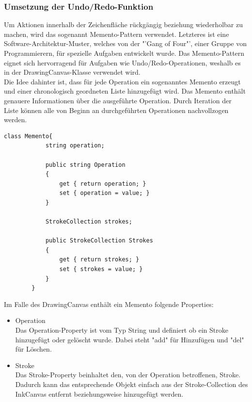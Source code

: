 \subsubsection{Umsetzung der Undo/Redo-Funktion}
Um Aktionen innerhalb der Zeichenfläche rückgängig beziehung wiederholbar zu machen, wird das sogenannt Memento-Pattern verwendet. Letzteres ist eine Software-Architektur-Muster, welches von der "'Gang of Four"', einer Gruppe von Programmierern, für spezielle Aufgaben entwickelt wurde. Das Memento-Pattern eignet sich hervorragend für Aufgaben wie Undo/Redo-Operationen, weshalb es in der DrawingCanvas-Klasse verwendet wird.\\
Die Idee dahinter ist, dass für jede Operation ein sogenanntes Memento erzeugt und einer chronologisch geordneten Liste hinzugefügt wird. Das Memento enthält genauere Informationen über die ausgeführte Operation. Durch Iteration der Liste können alle von Beginn an durchgeführten Operationen nachvollzogen werden.\\
\begin{lstlisting}[language = CSharp, captionpos=b, caption={Die Memento-Klasse}]
class Memento{
            string operation;

            public string Operation
            {
                get { return operation; }
                set { operation = value; }
            }

            StrokeCollection strokes;

            public StrokeCollection Strokes
            {
                get { return strokes; }
                set { strokes = value; }
            }
        }
\end{lstlisting}
Im Falle des DrawingCanvas enthält ein Memento folgende Properties:
\begin{itemize}
\item Operation\\
Das Operation-Property ist vom Typ String und definiert ob ein Stroke hinzugefügt oder gelöscht wurde. Dabei steht "add" für Hinzufügen und "del" für Löschen.
\item Stroke\\
Das Stroke-Property beinhaltet den, von der Operation betroffenen, Stroke. Dadurch kann das entsprechende Objekt einfach aus der Stroke-Collection des InkCanvas entfernt beziehungsweise hinzugefügt werden.
\end{itemize}

